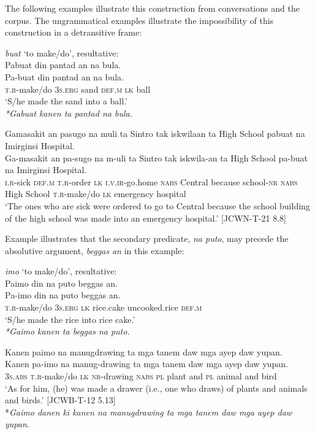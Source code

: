 The following examples illustrate this construction from conversations and the corpus. The ungrammatical examples illustrate the impossibility of this construction in a detransitive frame:

\ea
\textit{buat} ‘to make/do’, resultative: \\
Pabuat	din	pantad	an	na	bula. \\\smallskip
\gll Pa-buat	din	pantad	an	na	bula. \\
\textsc{t.r}-make/do	3\textsc{s.erg}	sand	\textsc{def.m}	\textsc{lk}	ball \\
\glt ‘S/he made the sand into a ball.’ \\\smallskip
\textit{*Gabuat kanen ta pantad na bula.}
\z

\ea
Gamasakit	an	pasugo	na	muli	ta	Sintro	tak	iskwilaan ta	High School	pabuat	na	Imirginsi	Hospital. \\\smallskip
\gll Ga-masakit	an	pa-sugo	na	m-uli	ta	Sintro	tak	iskwila-an ta	High School	pa-buat	na	Imirginsi	Hospital. \\
\textsc{i.r}-sick	\textsc{def.m}	\textsc{t.r}-order	\textsc{lk}	\textsc{i.v.ir}-go.home	\textsc{nabs}	Central	because	school-\textsc{nr} \textsc{nabs}	High School	\textsc{t.r}-make/do	\textsc{lk}	emergency	hospital \\
\glt ‘The ones who are sick were ordered to go to Central because the school building of the high school was made into an emergency hospital.’ [JCWN-T-21 8.8]
\z

Example  illustrates that the secondary predicate, \textit{na puto}, may precede the absolutive argument, \textit{beggas an} in this example:

\ea
\label{ex:ricecake}
\textit{imo} ‘to make/do’, resultative: \\
Paimo	din	na	puto	beggas	an. \\\smallskip
\gll Pa-imo	din	na	puto	beggas	an. \\
\textsc{t.r}-make/do	3\textsc{s.erg}	\textsc{lk}	rice.cake 	uncooked.rice	\textsc{def.m} \\
\glt ‘S/he made the rice into rice cake.’ \\\smallskip
\textit{*Gaimo kanen ta beggas na puto.}
\z

\ea
Kanen	paimo	na	manugdrawing	ta	mga	tanem	daw	mga	ayep	daw	yupan. \\\smallskip
\gll Kanen	pa-imo	na	manug-drawing	ta	mga	tanem	daw	mga	ayep	daw	yupan. \\
3\textsc{s.abs}	\textsc{t.r}-make/do	\textsc{lk}	\textsc{nr}-drawing	\textsc{nabs}	\textsc{pl}	plant	and	\textsc{pl}	animal	and	bird \\
\glt ‘As for him, (he) was made a drawer (i.e., one who draws) of plants and animals and birds.’ [JCWB-T-12 5.13] \\\smallskip
*\textit{Gaimo danen ki kanen na manugdrawing ta mga tanem daw mga ayep daw yupan}. \\
\z

